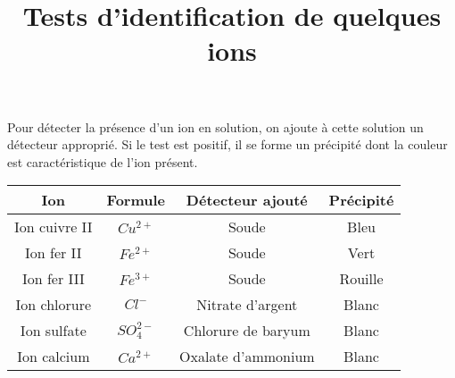 \documentclass[a4paper, 14pt]{article}
\title{Tests d'identification de quelques ions}
\date{}
\begin{document}
	
\maketitle

Pour détecter la présence d'un ion en solution, on ajoute à cette solution un détecteur approprié. Si le test est positif, il se forme un précipité dont la couleur est caractéristique de l'ion présent.

\begin{huge}
	
\begin{center}
	
\begin{tabular}{|@{\ }c@{\ }|@{\ }c@{\ }|@{\ }c@{\ }|@{\ }c@{\ }|}
	\hline
	\textbf{Ion} & \textbf{Formule} & \textbf{Détecteur ajouté} & \textbf{Précipité} \\
	
	\hline
	Ion cuivre II & $Cu^{2+}$ & Soude & Bleu \\
	\hline
	Ion fer II & $Fe^{2+}$ & Soude & Vert \\
	\hline
	Ion fer III & $Fe^{3+}$ & Soude & Rouille \\
	\hline
	Ion chlorure & $Cl^{-}$ & Nitrate d'argent & Blanc \\
	\hline
	Ion sulfate & $SO_{4}^{2-}$ & Chlorure de baryum & Blanc \\
	\hline
	Ion calcium & $Ca^{2+}$ & Oxalate d'ammonium & Blanc \\
	\hline
\end{tabular}
\end{center}
\end{huge}
\end{document}
